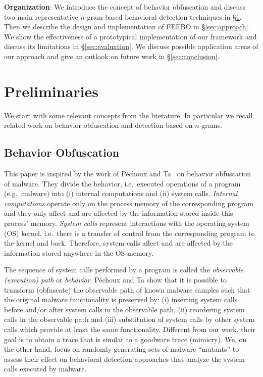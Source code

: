 \documentclass{llncs}
\begin{document}
\textbf{Organization}: We introduce the concept of behavior obfuscation and discuss two main representative $n$-gram-based behavioral detection techniques in \S\ref{sec:preliminaries}. Then we describe the design and implementation of FEEBO in \S\ref{sec:approach}. We show the effectiveness of a prototypical implementation of our framework and discuss its limitations in \S\ref{sec:evaluation}. We discuss possible application areas of our approach and give an outlook on future work in \S\ref{sec:conclusion}.


 
\section{Preliminaries}
\label{sec:preliminaries}

We start with some relevant concepts from the literature. In particular we recall related work
on behavior obfuscation and detection based on $n$-grams.

\subsection{Behavior Obfuscation}

This paper is inspired by the work of P\'{e}choux and Ta~\cite{pechoux2014} on behavior obfuscation of malware. They divide the behavior, i.e.~executed operations of a program (e.g.~malware) into (i) internal computations and (ii) system calls. \emph{Internal computations} operate only on the process memory of the corresponding program and they only affect and are affected by the information stored inside this process' memory. \emph{System calls} represent interactions with the operating system (OS) kernel, i.e.~there is a transfer of control from the corresponding program to the kernel and back. Therefore, system calls affect and are affected by the information stored anywhere in the OS memory. 

The sequence of system calls performed by a program is called the \emph{observable (execution) path} or \emph{behavior}. P\'{e}choux and Ta show that it is possible to transform (obfuscate) the observable path of known malware samples such that the original malware functionality is preserved by: (i) inserting system calls before and/or after system calls in the observable path, (ii) reordering system calls in the observable path and (iii) substitution of system calls by other system calls which provide at least the same functionality. Different from our work, their goal is to obtain a trace that is similar to a goodware trace (mimicry). We, on the other hand, focus on randomly generating sets of malware ``mutants'' to assess their effect on behavioral detection approaches that analyze the system calls executed by malware.
\end{document}
